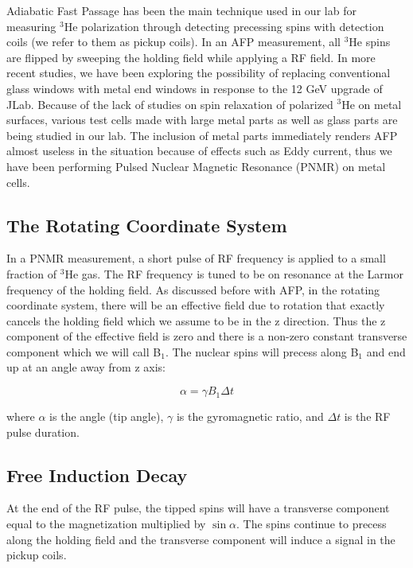 Adiabatic Fast Passage has been the main technique used in our lab for measuring $^{3}$He polarization through detecting precessing spins with detection coils (we refer to them as pickup coils). In an AFP measurement, all $^{3}$He spins are flipped by sweeping the holding field while applying a RF field. In more recent studies, we have been exploring the possibility of replacing conventional glass windows with metal end windows in response to the 12 GeV upgrade of JLab. Because of the lack of studies on spin relaxation of polarized $^{3}$He on metal surfaces, various test cells made with large metal parts as well as glass parts are being studied in our lab. The inclusion of metal parts immediately renders AFP almost useless in the situation because of effects such as Eddy current, thus we have been performing Pulsed Nuclear Magnetic Resonance (PNMR) on metal cells.

\subsection{The Rotating Coordinate System}

In a PNMR measurement, a short pulse of RF frequency is applied to a small fraction of $^{3}$He gas. The RF frequency is tuned to be on resonance at the Larmor frequency of the holding field. As discussed before with AFP, in the rotating coordinate system, there will be an effective field due to rotation that exactly cancels the holding field which we assume to be in the z direction. Thus the z component of the effective field is zero and there is a non-zero constant transverse component which we will call B$_{1}$. The nuclear spins will precess along B$_{1}$ and end up at an angle away from z axis: 

\begin{equation}
\alpha = \gamma B_{1} \Delta t
\end{equation}

where $\alpha$ is the angle (tip angle), $\gamma$ is the gyromagnetic ratio, and $\Delta t$ is the RF pulse duration. 

\subsection{Free Induction Decay}

At the end of the RF pulse, the tipped spins will have a transverse component equal to the magnetization multiplied by $\sin{\alpha}$. The spins continue to precess along the holding field and the transverse component will induce a signal in the pickup coils. 

